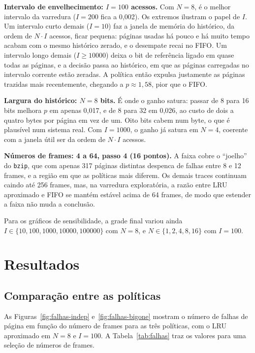 \documentclass[12pt]{article}
\begin{document}
\textbf{Intervalo de envelhecimento: $I=100$ acessos.} Com $N=8$, é o melhor
intervalo da varredura ($I=200$ fica a 0,002). Os extremos ilustram o papel de
$I$. Um intervalo curto demais ($I=10$) faz a janela de memória do histórico,
da ordem de $N \cdot I$ acessos, ficar pequena: páginas usadas há pouco e há
muito tempo acabam com o mesmo histórico zerado, e o desempate recai no FIFO.
Um intervalo longo demais ($I \geq 10000$) deixa o bit de referência ligado em
quase todas as páginas, e a decisão passa ao histórico, em que as páginas
carregadas no intervalo corrente estão zeradas. A política então expulsa
justamente as páginas trazidas mais recentemente, chegando a $p \approx 1{,}58$,
pior que o FIFO.

\textbf{Largura do histórico: $N=8$ bits.} É onde o ganho satura: passar de 8
para 16 bits melhora $p$ em apenas 0,017, e de 8 para 32 em 0,026, ao custo de
dois a quatro bytes por página em vez de um. Oito bits cabem num byte, o que é
plausível num sistema real. Com $I=1000$, o ganho já satura em $N=4$, coerente
com a janela útil ser da ordem de $N \cdot I$ acessos.

\textbf{Números de frames: 4 a 64, passo 4 (16 pontos).} A faixa cobre o
``joelho'' do \texttt{bzip}, que com apenas 317 páginas distintas despenca de
falhas entre 8 e 12 frames, e a região em que as políticas mais diferem. Os
demais traces continuam caindo até 256 frames, mas, na varredura exploratória,
a razão entre LRU aproximado e FIFO se mantém estável acima de 64 frames, de
modo que estender a faixa não muda a conclusão.

Para os gráficos de sensibilidade, a grade final variou ainda
$I \in \{10, 100, 1000, 10000, 100000\}$ com $N=8$, e
$N \in \{1, 2, 4, 8, 16\}$ com $I=100$.

\section{Resultados}\label{sec:resultados}

\subsection{Comparação entre as políticas}

As Figuras~\ref{fig:falhas-indep} e~\ref{fig:falhas-bigone} mostram o número de
falhas de página em função do número de frames para as três políticas, com o
LRU aproximado em $N=8$ e $I=100$. A Tabela~\ref{tab:falhas} traz os valores
para uma seleção de números de frames.
\end{document}
